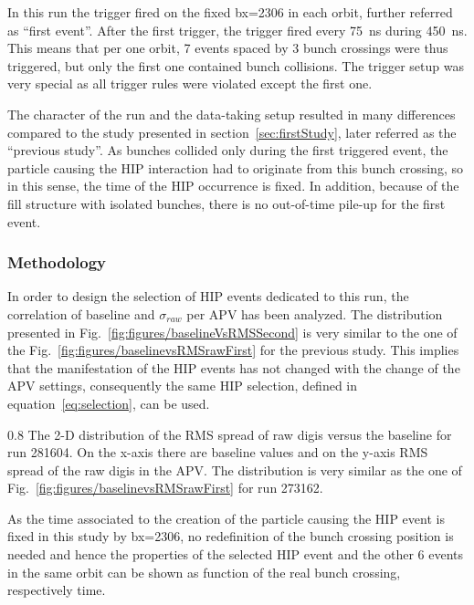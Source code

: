 In this run the trigger fired on the fixed bx=2306 in each orbit, further referred as ``first event''. After the first trigger, the trigger fired every 75~ns during 450~ns. This means that per one orbit, 7 events spaced by 3 bunch crossings were thus triggered, but only the first one contained bunch collisions. The trigger setup was very special as all trigger rules were violated except the first one.


The character of the run and  the data-taking setup resulted in many differences compared to the study presented in section~\ref{sec:firstStudy}, later referred as the ``previous study''. As bunches collided only during the first triggered event, the particle causing the HIP interaction had to originate from this bunch crossing, so in this sense, the time of the HIP occurrence is fixed. In addition, because of the fill structure with isolated bunches, there is no out-of-time pile-up for the first event.

\subsubsection{Methodology}

In order to design the selection of HIP events dedicated to this run, the correlation of baseline and $\sigma_{raw}$ per APV has been analyzed. The distribution presented in Fig.~\ref{fig:figures/baselineVsRMSSecond} is very similar to the one of the Fig.~\ref{fig:figures/baselinevsRMSrawFirst} for the previous study. This implies that the manifestation of the HIP events has not changed with the change of the APV settings, consequently the same HIP selection, defined in equation~\ref{eq:selection}, can be used.

                 {0.8}       %
                 {The 2-D distribution of the RMS spread of raw digis versus the baseline for run 281604. On the x-axis there are baseline values and on the y-axis RMS spread of the raw digis in the APV. The distribution is very similar as the one of Fig.~\ref{fig:figures/baselinevsRMSrawFirst} for run 273162. } %

As the time associated to the creation of the particle causing the HIP event is fixed in this study by bx=2306, no redefinition of the bunch crossing position is needed and hence the properties of the selected HIP event and the other 6 events in the same orbit can be shown as function of the real bunch crossing, respectively time.

